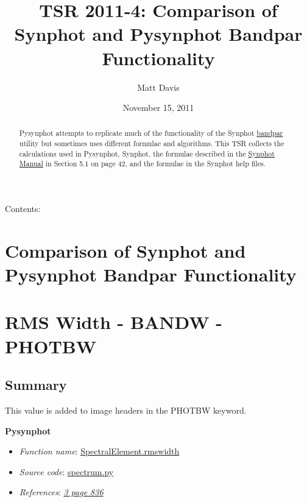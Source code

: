 \documentclass[letterpaper,10pt,english]{sphinxtsr}
\title{TSR 2011-4: Comparison of Synphot and Pysynphot Bandpar Functionality}
\date{November 15, 2011}
\author{Matt Davis}
\begin{document}
\maketitle
\tableofcontents
{}\label{index::doc}


Contents:


\chapter{Comparison of Synphot and Pysynphot Bandpar Functionality}
\label{main:comparison-of-synphot-and-pysynphot-bandpar-functionality}\label{main:tsr-2011-4-comparison-of-synphot-and-pysynphot-bandpar-functionality}\label{main::doc}
\begin{abstract}

Pysynphot attempts to replicate much of the functionality of the Synphot
\href{https://svn.stsci.edu/trac/ssb/stsci\_python/browser/stsdas/trunk/stsdas/pkg/hst\_calib/synphot/doc/bandpar.hlp}{bandpar}
utility but sometimes uses different formulae and algorithms.
This TSR collects the calculations used in Pysynphot, Synphot, the
formulae described in the \href{http://stsdas.stsci.edu/stsci\_python\_epydoc/SynphotManual.pdf}{Synphot Manual} in Section 5.1 on page 42,
and the formulae in the Synphot help files.

\end{abstract}


\chapter{RMS Width - BANDW - PHOTBW}
\label{main:synphot-manual}\label{main:rms-width-bandw-photbw}

\section{Summary}
\label{main:summary}
This value is added to image headers in the PHOTBW keyword.

\textbf{Pysynphot}
\begin{itemize}
\item {} 
\emph{Function name}: \href{https://trac.assembla.com/astrolib/browser/trunk/pysynphot/lib/pysynphot/spectrum.py\#L1106}{SpectralElement.rmswidth}

\item {} 
\emph{Source code}: \href{https://trac.assembla.com/astrolib/browser/trunk/pysynphot/lib/pysynphot/spectrum.py}{spectrum.py}

\item {} 
\emph{References}: {\hyperref[references:ref3]{\emph{3 page 836}}}

\end{itemize}
\end{document}
